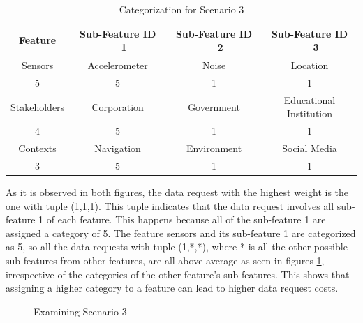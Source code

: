 \begin{table}[h!]
  \centering
  \caption{Categorization for Scenario 3}
  \label{tab:scenario4}
  \begin{tabular}{cccc}
    \toprule
    Feature & Sub-Feature ID = 1 & Sub-Feature ID = 2 & Sub-Feature ID = 3\\
    \midrule
    Sensors & Accelerometer & Noise & Location\\
     5 & 5 & 1 & 1\\ \hhline{====}
     Stakeholders & Corporation & Government & Educational Institution\\
     4 & 5 & 1 & 1\\ \hhline{====}
     Contexts & Navigation & Environment & Social Media\\
     3 & 5 & 1 & 1\\ 
    \bottomrule
  \end{tabular}
\end{table}

As it is observed in both figures, the data request with the highest weight is the one with tuple (1,1,1). This tuple indicates that the data request involves all sub-feature 1 of each feature. This happens because all of the sub-feature 1 are assigned a category of 5. The feature sensors and its sub-feature 1 are categorized as 5, so all the data requests
with tuple (1,*,*), where * is all the other possible sub-features from other features, are all above average as seen in figures \ref{fig:scenatio4}, irrespective of the categories of the other feature's sub-features. This shows that assigning a higher category to a feature can lead to higher data request costs. 

\begin{figure}[htp]
  \caption{Examining Scenario 3}
  \label{fig:scenatio4}
\end{figure}

